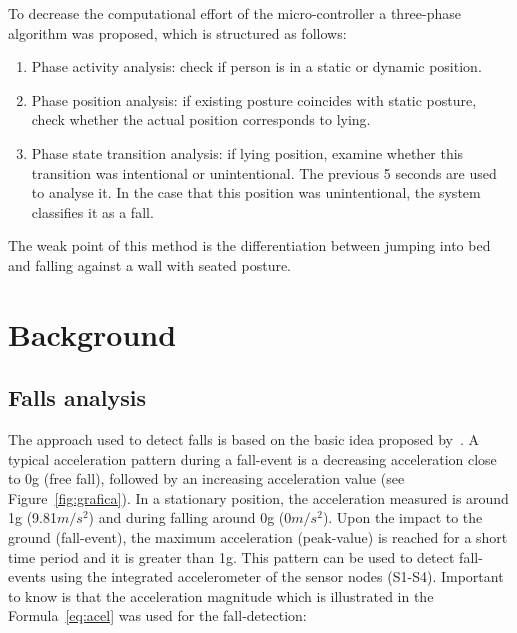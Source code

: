 \documentclass[conference]{IEEEtran}
\theoremstyle{definition}
\begin{document}
To decrease the computational effort of the micro-controller a three-phase algorithm was proposed, which is structured 
as follows:

\begin{enumerate}
 \item Phase activity analysis: check if person is in a static or dynamic position.
 \item Phase position analysis: if existing posture coincides with static posture, check whether the actual position corresponds to lying.
 \item Phase state transition analysis: if lying position, examine whether this transition was intentional or unintentional. The previous 5 
 seconds are used to analyse it. In the case that this position was unintentional, the system classifies it as a fall. 
\end{enumerate}

The weak point of this method is the differentiation between jumping into bed and falling against a wall with seated posture.

\section{Background}
\label{sec:background}

\subsection{Falls analysis}
\label{subsec:analysis}

The approach used to detect falls is based on the basic idea proposed by~\cite{Gjoreski2014,Kozina}. A typical acceleration pattern during 
a fall-event is a decreasing acceleration close to 0g (free fall), followed by an increasing acceleration value (see Figure~\ref{fig:grafica}). In a stationary position, 
the acceleration measured is around 1g (9.81$m/s^{2}$) and during falling around 0g (0$m/s^{2}$). Upon the impact to the ground (fall-event), 
the maximum acceleration (peak-value) is reached for a short time period and it is greater than 1g. This pattern can be used to 
detect fall-events using the integrated accelerometer of the sensor nodes (S1-S4). Important to know is that the acceleration 
magnitude which is illustrated in the Formula~\ref{eq:acel} was used for the fall-detection:
\end{document}
